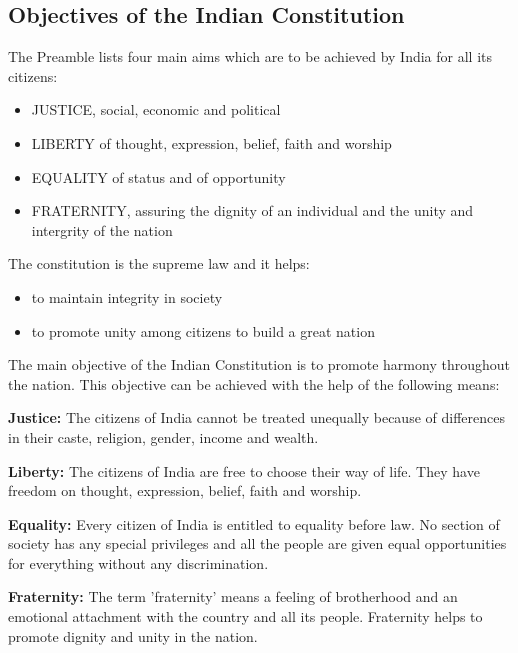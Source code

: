 \subsection{Objectives of the Indian Constitution}
The Preamble lists four main aims which are to be achieved by India for all its citizens:
\begin{itemize}
    \item JUSTICE, social, economic and political
    \item LIBERTY of thought, expression, belief, faith and worship
    \item EQUALITY of status and of opportunity
    \item FRATERNITY, assuring the dignity of an individual and the unity and intergrity of the nation
\end{itemize}
The constitution is the supreme law and it helps:
\begin{itemize}
    \item to maintain integrity in society
    \item to promote unity among citizens to build a great nation
\end{itemize}
The main objective of the Indian Constitution is to promote harmony throughout the nation. This objective can be achieved with the help of the following means:
\vspace{0.1in}
\par
\textbf{Justice:} The citizens of India cannot be treated unequally because of differences in their caste, religion, gender, income and wealth.
\vspace{0.1in}
\par
\textbf{Liberty:} The citizens of India are free to choose their way of life. They have freedom on thought, expression, belief, faith and worship.
\vspace{0.1in}
\par
\textbf{Equality:} Every citizen of India is entitled to equality before law. No section of society has any special privileges and all the people are given equal opportunities for everything without any discrimination.
\vspace{0.1in}
\par
\textbf{Fraternity:} The term 'fraternity' means a feeling of brotherhood and an emotional attachment with the country and all its people. Fraternity helps to promote dignity and unity in the nation.
\vspace{1in}
